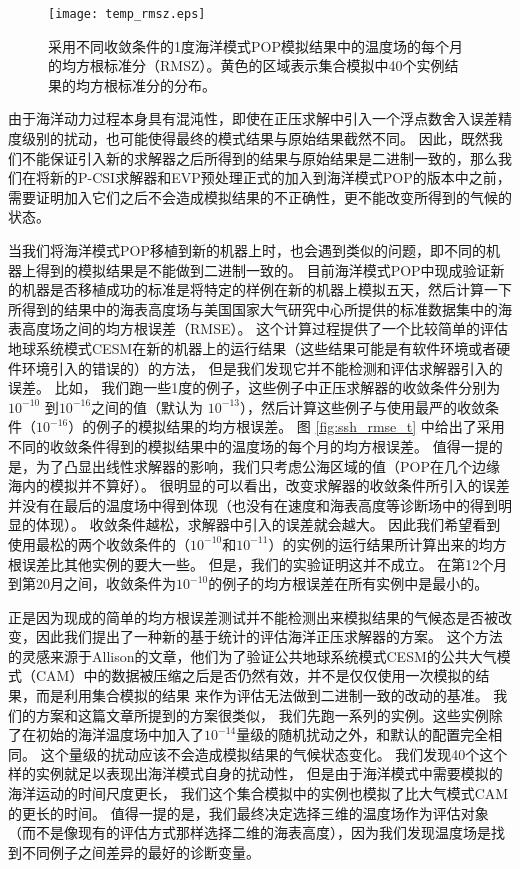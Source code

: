 \begin{figure}%
\begin{center}
\texttt{[image: temp\_rmsz.eps]}
\end{center}
\caption[] {采用不同收敛条件的1度海洋模式POP模拟结果中的温度场的每个月的均方根标准分（RMSZ）。黄色的区域表示集合模拟中40个实例结果的均方根标准分的分布。 }
\label{fig:ssh_rmsz_t}
\end{figure}
 
由于海洋动力过程本身具有混沌性，即使在正压求解中引入一个浮点数舍入误差精度级别的扰动，也可能使得最终的模式结果与原始结果截然不同。 
因此，既然我们不能保证引入新的求解器之后所得到的结果与原始结果是二进制一致的，那么我们在将新的P-CSI求解器和EVP预处理正式的加入到海洋模式POP的版本中之前，需要证明加入它们之后不会造成模拟结果的不正确性，更不能改变所得到的气候的状态。 

当我们将海洋模式POP移植到新的机器上时，也会遇到类似的问题，即不同的机器上得到的模拟结果是不能做到二进制一致的。 
目前海洋模式POP中现成验证新的机器是否移植成功的标准是将特定的样例在新的机器上模拟五天，然后计算一下所得到的结果中的海表高度场与美国国家大气研究中心所提供的标准数据集中的海表高度场之间的均方根误差（RMSE）。
这个计算过程提供了一个比较简单的评估地球系统模式CESM在新的机器上的运行结果（这些结果可能是有软件环境或者硬件环境引入的错误的）的方法， 但是我们发现它并不能检测和评估求解器引入的误差。 
比如， 我们跑一些1度的例子，这些例子中正压求解器的收敛条件分别为$10^{-10}$ 到$10^{-16}$之间的值（默认为 $10^{-13}$），然后计算这些例子与使用最严的收敛条件（$10^{-16}$）的例子的模拟结果的均方根误差。 
图 \ref{fig:ssh_rmse_t} 中给出了采用不同的收敛条件得到的模拟结果中的温度场的每个月的均方根误差。 
值得一提的是，为了凸显出线性求解器的影响，我们只考虑公海区域的值（POP在几个边缘海内的模拟并不算好）。 
很明显的可以看出，改变求解器的收敛条件所引入的误差并没有在最后的温度场中得到体现（也没有在速度和海表高度等诊断场中的得到明显的体现）。 
收敛条件越松，求解器中引入的误差就会越大。
因此我们希望看到使用最松的两个收敛条件的（$10^{-10}$和$10^{-11}$）的实例的运行结果所计算出来的均方根误差比其他实例的要大一些。 
但是，我们的实验证明这并不成立。 
在第12个月到第20月之间，收敛条件为$10^{-10}$的例子的均方根误差在所有实例中是最小的。 


正是因为现成的简单的均方根误差测试并不能检测出来模拟结果的气候态是否被改变，因此我们提出了一种新的基于统计的评估海洋正压求解器的方案。 
这个方法的灵感来源于Allison的文章\cite{baker2014methodology}，他们为了验证公共地球系统模式CESM的公共大气模式（CAM）中的数据被压缩之后是否仍然有效，并不是仅仅使用一次模拟的结果，而是利用集合模拟的结果 来作为评估无法做到二进制一致的改动的基准。 
我们的方案和这篇文章所提到的方案很类似\cite{baker2014methodology}， 我们先跑一系列的实例。这些实例除了在初始的海洋温度场中加入了$10^{-14}$量级的随机扰动之外，和默认的配置完全相同。 
这个量级的扰动应该不会造成模拟结果的气候状态变化。 
我们发现40个这个样的实例就足以表现出海洋模式自身的扰动性， 但是由于海洋模式中需要模拟的海洋运动的时间尺度更长， 我们这个集合模拟中的实例也模拟了比大气模式CAM的更长的时间。 
值得一提的是，我们最终决定选择三维的温度场作为评估对象（而不是像现有的评估方式那样选择二维的海表高度），因为我们发现温度场是找到不同例子之间差异的最好的诊断变量。 
 




